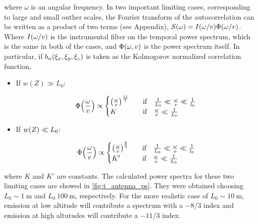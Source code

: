 where $\omega$ is an angular frequency. In two important limiting cases,
corresponding to large and small outher scales, the
Fourier transform of the
autocorrelation can be written as a product of two terms (see Appendix),
$S\qty(\omega) = I\qty(\omega/v)\Phi\qty(\omega/v)$. Where
$I\qty(\omega/v)$ is the instrumental filter on the temporal power spectrum,
which is the same in both of the cases,
and $\Phi\qty(\omega,v)$ is the power spectrum itself. In particular, if
$b_\alpha\qty(\xi_x,\xi_y,\xi_z)$ is taken as the Kolmogorov normalized
correlation function,

\begin{itemize}
        \item If $w(Z) \gg L_0$:

        \begin{equation}
                \Phi\qty(\frac{\omega}{v}) \propto
                        \begin{cases}
                                \qty(\frac{\omega}{v})^{\frac{11}{3}} & \qif
                                \frac{1}{L_0} \ll \frac{\omega}{v}
                                \ll \frac{1}{l_0} \\
                                K & \qif \frac{\omega}{v} \ll \frac{1}{L_0}
                        \end{cases}
        \end{equation}

        \item If $w\qty(Z) \ll L_0$:

        \begin{equation}
                \Phi\qty(\frac{\omega}{v}) \propto
                        \begin{cases}
                                \qty(\frac{\omega}{v})^{\frac{8}{3}} & \qif
                                \frac{1}{L_0} \ll \frac{\omega}{v}
                                \ll \frac{1}{l_0} \\
                                K' & \qif \frac{\omega}{v} \ll \frac{1}{L_0}
                        \end{cases}
        \end{equation}
\end{itemize}

where $K$ and $K'$ are constants. The calculated power spectra for these
two limiting cases are showed in \autoref{fig:t_antenna_ps}. They were
obtained choosing $L_0 \sim \SI{1}{\meter}$ and $L_0 ~ \SI{100}{\meter}$,
respectively. For the more realistic case of $L_0 \sim \SI{10}{\meter}$,
emission at low altitude will contribute a spectrum with a $-8/3$ index and
emission at high altutudes will contribute a $-11/3$ index.

